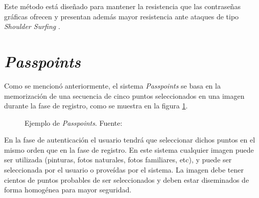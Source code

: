 Este método está diseñado para mantener la resistencia que las contraseñas gráficas ofrecen y presentan adem\'as mayor resistencia ante ataques de tipo \textit{Shoulder Surfing} 
 \cite{lashkari2009shoulder}.






\section{\textit{Passpoints}}

Como se mencionó anteriormente, el sistema \textit{Passpoints} \cite{wiedenbeck2005passpoints} se basa en la memorización de una secuencia de cinco puntos seleccionados en una imagen durante la fase de registro, como se muestra en la figura \ref{passpoints-example}.

\begin{figure}[H]
	\centering
		\begin{minipage}[b]{0.7\linewidth}  %
		\centering
		\caption{Ejemplo de \textit{Passpoints}. Fuente: \cite{wiedenbeck2005passpoints}}
		\label{passpoints-example}
	\end{minipage}%
	
\end{figure}
En la fase de autenticación el usuario tendrá  que  seleccionar dichos puntos en el mismo orden que en la fase de registro. En  este  sistema  cualquier  imagen  puede  ser  utilizada  (pinturas,  fotos  naturales,  fotos  familiares,  etc),  y  puede  ser seleccionada  por  el  usuario  o proveídas por  el  sistema.  La  imagen  debe  tener  cientos  de  puntos  probables  de  ser seleccionados y deben estar diseminados de forma homogénea para mayor seguridad.
 
